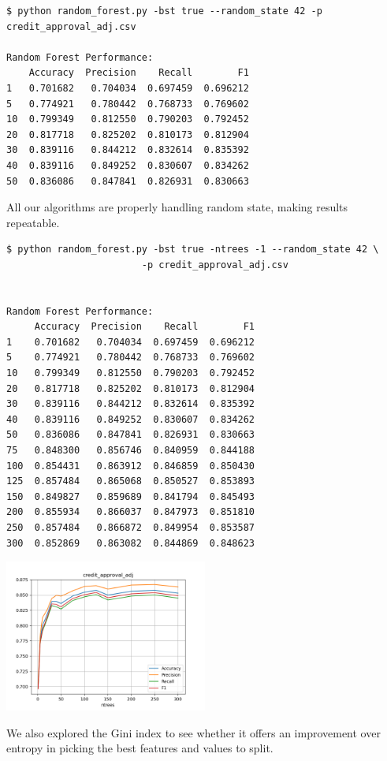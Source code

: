 \begin{verbatim}
$ python random_forest.py -bst true --random_state 42 -p credit_approval_adj.csv

Random Forest Performance: 
    Accuracy  Precision    Recall        F1
1   0.701682   0.704034  0.697459  0.696212
5   0.774921   0.780442  0.768733  0.769602
10  0.799349   0.812550  0.790203  0.792452
20  0.817718   0.825202  0.810173  0.812904
30  0.839116   0.844212  0.832614  0.835392
40  0.839116   0.849252  0.830607  0.834262
50  0.836086   0.847841  0.826931  0.830663
\end{verbatim}

All our algorithms are properly handling random state, making results repeatable.


\begin{verbatim}
$ python random_forest.py -bst true -ntrees -1 --random_state 42 \
                        -p credit_approval_adj.csv


Random Forest Performance: 
     Accuracy  Precision    Recall        F1
1    0.701682   0.704034  0.697459  0.696212
5    0.774921   0.780442  0.768733  0.769602
10   0.799349   0.812550  0.790203  0.792452
20   0.817718   0.825202  0.810173  0.812904
30   0.839116   0.844212  0.832614  0.835392
40   0.839116   0.849252  0.830607  0.834262
50   0.836086   0.847841  0.826931  0.830663
75   0.848300   0.856746  0.840959  0.844188
100  0.854431   0.863912  0.846859  0.850430
125  0.857484   0.865068  0.850527  0.853893
150  0.849827   0.859689  0.841794  0.845493
200  0.855934   0.866037  0.847973  0.851810
250  0.857484   0.866872  0.849954  0.853587
300  0.852869   0.863082  0.844869  0.848623
\end{verbatim}

\includegraphics[width=0.5\textwidth]{./figures/rf_credit_approval_adj_entropy.png}

We also explored the Gini index to see whether it offers an improvement over entropy in picking the best features and values to split.

